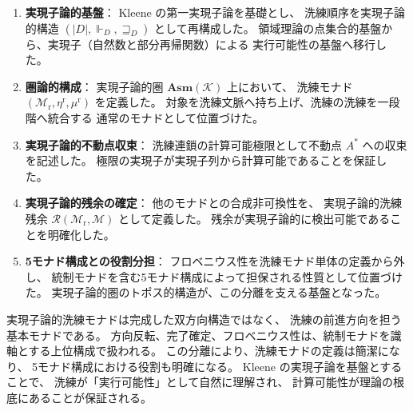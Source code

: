 \documentclass[11pt,a4paper]{article}
\theoremstyle{definition}
\newcommand{\Mr}{\mathcal{M}_{\mathrm{r}}}
\newcommand{\etar}{\eta^{\mathrm{r}}}
\newcommand{\mur}{\mu^{\mathrm{r}}}
\newcommand{\Asm}{\mathbf{Asm}}
\newcommand{\Real}{\Vdash}
\begin{document}
\begin{enumerate}
\item \textbf{実現子論的基盤}：
  Kleene の第一実現子論を基礎とし、
  洗練順序を実現子論的構造 $(|D|,\Real_D,\sqsupseteq_D)$ として再構成した。
  領域理論の点集合的基盤から、実現子（自然数と部分再帰関数）による
  実行可能性の基盤へ移行した。

\item \textbf{圏論的構成}：
  実現子論的圏 $\Asm(\mathcal{K})$ 上において、
  洗練モナド $(\Mr,\etar,\mur)$ を定義した。
  対象を洗練文脈へ持ち上げ、洗練の洗練を一段階へ統合する
  通常のモナドとして位置づけた。

\item \textbf{実現子論的不動点収束}：
  洗練連鎖の計算可能極限として不動点 $A^*$ への収束を記述した。
  極限の実現子が実現子列から計算可能であることを保証した。

\item \textbf{実現子論的残余の確定}：
  他のモナドとの合成非可換性を、
  実現子論的洗練残余 $\mathcal{R}(\Mr,\mathcal{M})$ として定義した。
  残余が実現子論的に検出可能であることを明確化した。

\item \textbf{5モナド構成との役割分担}：
  フロベニウス性を洗練モナド単体の定義から外し、
  統制モナドを含む5モナド構成によって担保される性質として位置づけた。
  実現子論的圏のトポス的構造が、この分離を支える基盤となった。
\end{enumerate}

実現子論的洗練モナドは完成した双方向構造ではなく、
洗練の前進方向を担う基本モナドである。
方向反転、完了確定、フロベニウス性は、統制モナドを識軸とする上位構成で扱われる。
この分離により、洗練モナドの定義は簡潔になり、
5モナド構成における役割も明確になる。
Kleene の実現子論を基盤とすることで、
洗練が「実行可能性」として自然に理解され、
計算可能性が理論の根底にあることが保証される。
\end{document}
